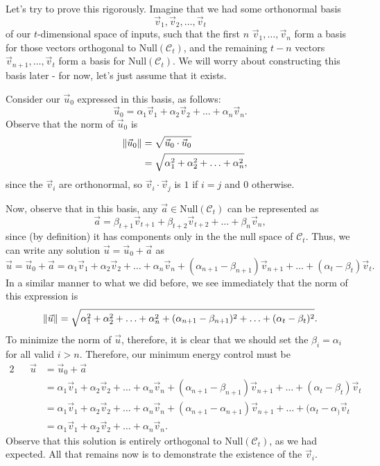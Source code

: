 \documentclass[letterpaper]{article}
\theoremstyle{remark}
\newcommand{\Null}[1]{\text{Null}(#1)}
\newcommand{\eqn}[1]{\begin{alignat*}{2}#1\end{alignat*}}
\begin{document}
Let's try to prove this rigorously. Imagine that we had some orthonormal basis
\[
    \vec{v}_1, \vec{v}_2, \ldots, \vec{v}_t
\]
of our $t$-dimensional space of inputs, such that the first $n$ $\vec{v}_1, \ldots, \vec{v}_n$ form a basis for those vectors orthogonal to $\Null{\mathscr{C}_t}$, and the remaining $t - n$ vectors $\vec{v}_{n+1}, \ldots, \vec{v}_t$ form a basis for $\Null{\mathscr{C}_t}$. We will worry about constructing this basis later - for now, let's just assume that it exists.

Consider our $\vec{u}_0$ expressed in this basis, as follows:
\[
    \vec{u}_0 = \alpha_1\vec{v}_1 + \alpha_2\vec{v}_2 + \ldots + \alpha_n\vec{v}_n.
\]
Observe that the norm of $\vec{u}_0$ is
\eqn{
    && \norm{\vec{u}_0} &= \sqrt{\vec{u}_0 \cdot \vec{u}_0} \\
    &&&= \sqrt{\alpha_1^2 + \alpha_2^2 + \ldots + \alpha_n^2},
}
since the $\vec{v}_i$ are orthonormal, so $\vec{v}_i \cdot \vec{v}_j$ is $1$ if $i = j$ and $0$ otherwise.

Now, observe that in this basis, any $\vec{a} \in \Null{\mathscr{C}_t}$ can be represented as
\[
    \vec{a} = \beta_{t+1}\vec{v}_{t+1} + \beta_{t+2}\vec{v}_{t+2} + \ldots + \beta_n\vec{v}_n,
\]
since (by definition) it has components only in the the null space of $\mathscr{C}_t$. Thus, we can write any solution $\vec{u} = \vec{u}_0 + \vec{a}$ as
\[
    \vec{u} = \vec{u}_0 + \vec{a} = \alpha_1\vec{v}_1 + \alpha_2\vec{v}_2 + \ldots + \alpha_n\vec{v}_n + (\alpha_{n+1}-\beta_{n+1})\vec{v}_{n + 1} + \ldots + (\alpha_t - \beta_t)\vec{v}_t.
\]
In a similar manner to what we did before, we see immediately that the norm of this expression is
\[
    \norm{\vec{u}} = \sqrt{\alpha_1^2 + \alpha_2^2 + \ldots + \alpha_n^2 + (\alpha_{n+1}-\beta_{n+1})^2 + \ldots + (\alpha_t - \beta_t)^2}.
\]
To minimize the norm of $\vec{u}$, therefore, it is clear that we should set the $\beta_i = \alpha_i$ for all valid $i > n$. Therefore, our minimum energy control must be
\eqn{
    && \vec{u} &= \vec{u}_0 + \vec{a} \\
    &&&= \alpha_1\vec{v}_1 + \alpha_2\vec{v}_2 + \ldots + \alpha_n\vec{v}_n + (\alpha_{n+1}-\beta_{n+1})\vec{v}_{n + 1} + \ldots + (\alpha_t - \beta_t)\vec{v}_t \\
    &&&= \alpha_1\vec{v}_1 + \alpha_2\vec{v}_2 + \ldots + \alpha_n\vec{v}_n + (\alpha_{n+1}-\alpha_{n+1})\vec{v}_{n + 1} + \ldots + (\alpha_t - \alpha_)\vec{v}_t \\
    &&&= \alpha_1\vec{v}_1 + \alpha_2\vec{v}_2 + \ldots + \alpha_n\vec{v}_n.
}
Observe that this solution is entirely orthogonal to $\Null{\mathscr{C}_t}$, as we had expected. All that remains now is to demonstrate the existence of the $\vec{v}_i$.
\end{document}

